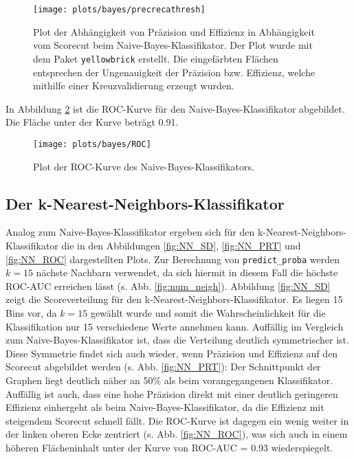 \begin{figure}
	\centering
	\texttt{[image: plots/bayes/precrecathresh]}
	\caption{Plot der Abhängigkeit von Präzision und Effizienz in Abhängigkeit vom Scorecut beim Naive-Bayes-Klassifikator. Der Plot wurde mit dem Paket \texttt{yellowbrick} \cite{yellowbrick} erstellt. Die eingefärbten Flächen entsprechen der Ungenauigkeit der Präzision bzw. Effizienz, welche mithilfe einer Kreuzvalidierung erzeugt wurden.}
	\label{fig:NB_PRT}
\end{figure}

In Abbildung \ref{fig:NB_ROC} ist die ROC-Kurve für den Naive-Bayes-Klassifikator abgebildet. Die Fläche unter der Kurve  beträgt 0.91.


\begin{figure}
	\centering
	\texttt{[image: plots/bayes/ROC]}
	\caption{Plot der ROC-Kurve des Naive-Bayes-Klassifikators.}
	\label{fig:NB_ROC}
\end{figure}


\subsection{Der k-Nearest-Neighbors-Klassifikator}

Analog zum Naive-Bayes-Klassifikator ergeben sich für den k-Nearest-Neighbors-Klas\-si\-fi\-ka\-tor die in den Abbildungen \ref{fig:NN_SD}, \ref{fig:NN_PRT} und \ref{fig:NN_ROC} dargestellten Plots. Zur Berechnung von \texttt{predict\_proba} werden $k = 15$ nächste Nachbarn verwendet, da sich hiermit in diesem Fall die höchste ROC-AUC erreichen lässt (s. Abb. \ref{fig:num_neigh}). Abbildung \ref{fig:NN_SD} zeigt die Scoreverteilung für den k-Nearest-Neighbors-Klassifikator. Es liegen 15 Bins vor, da $k = 15$ gewählt wurde und somit die Wahrscheinlichkeit für die Klassifikation nur 15 verschiedene Werte annehmen kann. Auffällig im Vergleich zum Naive-Bayes-Klassifikator ist, dass die Verteilung deutlich symmetrischer ist. Diese Symmetrie findet sich auch wieder, wenn Präzision und Effizienz auf den Scorecut abgebildet werden (s. Abb. \ref{fig:NN_PRT}): Der Schnittpunkt der Graphen liegt deutlich näher an 50\% als beim vorangegangenen Klassifikator. Auffällig ist auch, dass eine hohe Präzision direkt mit einer deutlich geringeren Effizienz einhergeht als beim Naive-Bayes-Klassifikator, da die Effizienz mit steigendem Scorecut schnell fällt. Die ROC-Kurve ist dagegen ein wenig weiter in der linken oberen Ecke zentriert (s. Abb. \ref{fig:NN_ROC}), was sich auch in einem höheren Flächeninhalt unter der Kurve von ROC-AUC = 0.93 wiederspiegelt.

